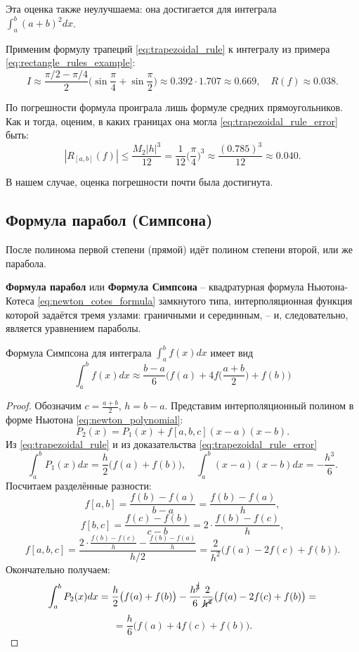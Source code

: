 \documentclass[../main.tex]{subfile}
\begin{document}
Эта оценка также неулучшаема: она достигается для интеграла\\
$\int_a^b (a+b)^2dx$.

\begin{example}\label{eq:trapezoidal_rule_example}
	Применим формулу трапеций \eqref{eq:trapezoidal_rule} к интегралу из
	примера \eqref{eq:rectangle_rules_example}:
	\[I\approx \frac{\pi/2-\pi/4}{2}\Big(\sin{\frac{\pi}{4}}+\sin{\frac{\pi}
	{2}}\Big)\approx 0.392\cdot 1.707\approx 0.669,\quad R(f)\approx 0.038.\]

	По погрешности формула проиграла лишь формуле средних прямоугольников.
	Как и тогда, оценим, в каких границах она могла
	\eqref{eq:trapezoidal_rule_error} быть:
	\[|R_{[a,b]}(f)|\le\frac{M_2|h|^3}{12}=\frac{1}{12}\Big(\frac{\pi}{4}
	\Big)^3\approx\frac{(0.785)^3}{12}\approx 0.040.\]

	В нашем случае, оценка погрешности почти была достигнута.
\end{example}

\subsection{Формула парабол (Симпсона)}
После полинома первой степени (прямой) идёт полином степени второй, или же
парабола.

\begin{define}
	\textbf{Формула парабол} или \textbf{Формула Симпсона} -- квадратурная
	формула Ньютона-Котеса \eqref{eq:newton_cotes_formula} замкнутого типа,
	интерполяционная функция которой задаётся тремя узлами: граничными и
	серединным, -- и, следовательно, является уравнением параболы.
\end{define}

\begin{theorem}\label{eq:simpsons_1_3_rule}
	Формула Симпсона для интеграла $\int_a^b f(x)dx$ имеет вид
	\[\boxed{\int_a^b f(x)dx\approx\frac{b-a}{6}\Big(f(a)+4f\big(\frac{a+b}
	{2}\big)+f(b)\Big)}\]
\end{theorem}

\begin{proof}
	Обозначим $c=\frac{a+b}{2}$, $h=b-a$. Представим интерполяционный полином
	в форме Ньютона
	\eqref{eq:newton_polynomial}:
	\[P_2(x)=P_1(x)+f[a,b,c](x-a)(x-b).\]
	Из \eqref{eq:trapezoidal_rule} и из доказательства
	\eqref{eq:trapezoidal_rule_error}
	\[\int_a^b P_1(x)dx=\frac{h}{2}\big(f(a)+f(b)\big),\quad\int_a^b (x-a)
	(x-b)dx=-\frac{h^3}{6}.\]
	Посчитаем разделённые разности:
	\[f[a,b]=\frac{f(b)-f(a)}{b-a}=\frac{f(b)-f(a)}{h},\]
	\[f[b,c]=\frac{f(c)-f(b)}{c-b}=2\cdot\frac{f(b)-f(c)}{h},\]
	\[f[a,b,c]=\frac{2\cdot\frac{f(b)-f(c)}{h}-\frac{f(b)-f(a)}{h}}{h/2}=
	\frac{2}{h^2}\big(f(a)-2f(c)+f(b)\big).\]
	Окончательно получаем:
	\[\int_a^b P_2(x)dx=\frac{h}{2}\big(f(a)+f(b)\big)-\frac{h^{\cancel{3}}}
	{6}\frac{2}{\cancel{h^2}}\big(f(a)-2f(c)+f(b)\big)=\]
	\[=\frac{h}{6}\big(f(a)+4f(c)+f(b)\big).\]
\end{proof}
\end{document}

